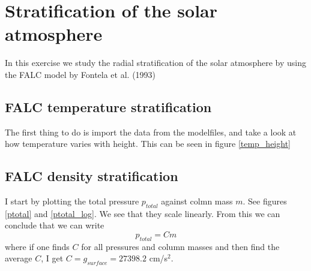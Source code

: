 \documentclass{aa}   %
\begin{document}
  


\section{Stratification of the solar atmosphere}
In this exercise we study the radial stratification of the solar atmosphere by using the FALC model by Fontela et al. (1993)

\subsection{FALC temperature stratification}
The first thing to do is import the data from the modelfiles, and take a look at how temperature varies with height.
This can be seen in figure \ref{temp_height}


\subsection{FALC density stratification}
I start by plotting the total pressure $p_{total}$ against colmn mass $m$. See figures \ref{ptotal} and \ref{ptotal_log}.
We see that they scale linearly. From this we can conclude that we can write 
\begin{equation}
 p_{total} = Cm
\end{equation}
where if one finds $C$ for all pressures and column masses and then find the average $C$, I get $C = g_{surface} = 27398.2$ cm/s$^2$.
\end{document}
